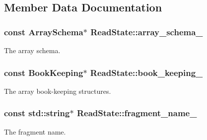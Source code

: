 \subsection{Member Data Documentation}
\hypertarget{classReadState_a82f571fce01a7869f065ac7cad996c56}{}
\subsubsection[{array\+\_\+schema\+\_\+}]{\setlength{\rightskip}{0pt plus 5cm}const {\bf Array\+Schema}$\ast$ Read\+State\+::array\+\_\+schema\+\_\+\hspace{0.3cm}{\ttfamily [private]}}\label{classReadState_a82f571fce01a7869f065ac7cad996c56}
The array schema. \hypertarget{classReadState_a5c8c6992cbec935ae0105bdd32d393d8}{}
\subsubsection[{book\+\_\+keeping\+\_\+}]{\setlength{\rightskip}{0pt plus 5cm}const {\bf Book\+Keeping}$\ast$ Read\+State\+::book\+\_\+keeping\+\_\+\hspace{0.3cm}{\ttfamily [private]}}\label{classReadState_a5c8c6992cbec935ae0105bdd32d393d8}
The array book-\/keeping structures. \hypertarget{classReadState_aeacb54ee4e3a49b76f5099d429b6a052}{}
\subsubsection[{fragment\+\_\+name\+\_\+}]{\setlength{\rightskip}{0pt plus 5cm}const std\+::string$\ast$ Read\+State\+::fragment\+\_\+name\+\_\+\hspace{0.3cm}{\ttfamily [private]}}\label{classReadState_aeacb54ee4e3a49b76f5099d429b6a052}
The fragment name. \hypertarget{classReadState_aedc33e4b6a486f30e0a0c4d40175d3dd}{}
